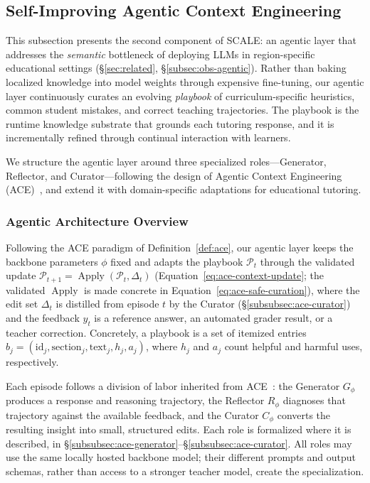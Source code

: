 \documentclass[10pt,conference]{IEEEtran}
\begin{document}
\subsection{Self-Improving Agentic Context Engineering}
\label{subsec:agentic-engine}

This subsection presents the second component of SCALE: an agentic 
layer that addresses the \textit{semantic} bottleneck of deploying 
LLMs in region-specific educational settings 
(§\ref{sec:related}, §\ref{subsec:obs-agentic}). Rather than baking 
localized knowledge into model weights through expensive fine-tuning, 
our agentic layer continuously curates an evolving \textit{playbook} 
of curriculum-specific heuristics, common student mistakes, and 
correct teaching trajectories. The playbook is the runtime knowledge 
substrate that grounds each tutoring response, and it is incrementally 
refined through continual interaction with learners.

We structure the agentic layer around three specialized 
roles---Generator, Reflector, and Curator---following the design of 
Agentic Context Engineering (ACE)~\cite{agenticcontext2026}, and 
extend it with domain-specific adaptations for educational tutoring.

\subsubsection{Agentic Architecture Overview}
\label{subsubsec:ace-architecture}

Following the ACE paradigm of Definition~\ref{def:ace}, our agentic layer
keeps the backbone parameters $\phi$ fixed and adapts the playbook
$\mathcal{P}_t$ through the validated update
$\mathcal{P}_{t+1}=\operatorname{Apply}(\mathcal{P}_t,\Delta_t)$
(Equation~\eqref{eq:ace-context-update}; the validated $\operatorname{Apply}$
is made concrete in Equation~\eqref{eq:ace-safe-curation}), where the edit
set $\Delta_t$ is distilled from episode $t$ by the Curator
(§\ref{subsubsec:ace-curator})
and the feedback $y_t$ is a reference answer, an automated grader result,
or a teacher correction. Concretely, a playbook is a set of itemized
entries $b_j=(\mathrm{id}_j,\mathrm{section}_j,\mathrm{text}_j,h_j,a_j)$,
where $h_j$ and $a_j$ count helpful and harmful uses, respectively.

Each episode follows a division of labor inherited from
ACE~\cite{agenticcontext2026}: the Generator $G_\phi$ produces a response
and reasoning trajectory, the Reflector $R_\phi$ diagnoses that trajectory
against the available feedback, and the Curator $C_\phi$ converts the
resulting insight into small, structured edits. Each role is formalized
where it is described, in
§\ref{subsubsec:ace-generator}--§\ref{subsubsec:ace-curator}. All roles
may use the same locally hosted backbone model; their different prompts
and output schemas, rather than access to a stronger teacher model,
create the specialization.
\end{document}
